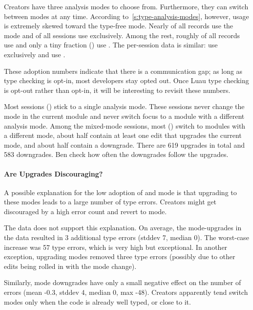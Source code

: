 \documentclass[english,submission,cleveref]{programming}
\begin{document}
Creators have three analysis modes to choose from.
Furthermore, they can switch between modes at any time.
According to~\cref{s:type-analysis-modes}, however, usage is
extremely skewed toward the type-free \mnocheck{} mode.
Nearly  of all records use the \mnocheck{} mode
and  of all sessions use \mnocheck{} exclusively.
Among the rest, roughly  of all records use \mnonstrict{} and only a
tiny fraction () use \mstrict{}.
The per-session data is similar:  use \mnonstrict{} exclusively
and  use \mstrict{}.

These adoption numbers indicate that there is a communication gap;
as long as type checking is opt-in, most developers stay opted out.
Once Luau type checking is opt-out rather than opt-in, it will be interesting
to revisit these numbers.

Most sessions () stick to a single analysis mode.
These sessions never change the mode in the current module and never switch
focus to a module with a different analysis mode.
Among the mixed-mode sessions, most () switch to modules with
a different mode, about half contain at least one edit that upgrades the
current mode, and about half contain a downgrade.
There are 619 upgrades in total and 583 downgrades.
\FILL{} Ben check how often the downgrades follow the upgrades.


\paragraph{Are Upgrades Discouraging?}


A possible explanation for the low adoption of \mnonstrict{} and
\mstrict{} mode is that upgrading to these modes leads to a large
number of type errors.
Creators might get discouraged by a high error count and revert to
\mnocheck{} mode.

The data does not support this explanation.
On average, the mode-upgrades in the data resulted in 3 additional
type errors (stddev 7, median 0).
The worst-case increase was 57 type errors, which is very high
but exceptional.
In another exception, upgrading modes removed three type errors
(possibly due to other edits being rolled in with the
mode change).

Similarly, mode downgrades have only a small negative effect on the
number of errors (mean -0.3, stddev 4, median 0, max -48).
Creators apparently tend switch modes only when the code is already
well typed, or close to it.
\end{document}
